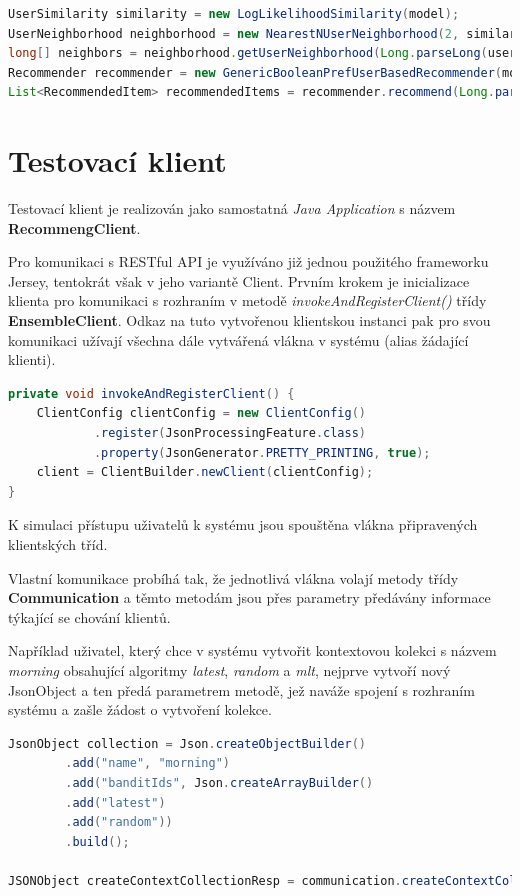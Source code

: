 \documentclass[thesis=M,czech]{FITthesis}[2014/05/07]
\begin{document}
\begin{lstlisting}[language=java]
UserSimilarity similarity = new LogLikelihoodSimilarity(model);
UserNeighborhood neighborhood = new NearestNUserNeighborhood(2, similarity, model);
long[] neighbors = neighborhood.getUserNeighborhood(Long.parseLong(userId));
Recommender recommender = new GenericBooleanPrefUserBasedRecommender(model, neighborhood, similarity);
List<RecommendedItem> recommendedItems = recommender.recommend(Long.parseLong(userId), limit);
\end{lstlisting}

\section{Testovací klient}
\label{chap:client}
Testovací klient je realizován jako samostatná \emph{Java Application} s názvem \textbf{RecommengClient}.

Pro komunikaci s RESTful API je využíváno již jednou použitého frameworku Jersey, tentokrát však v jeho variantě Client. Prvním krokem je inicializace klienta pro komunikaci s rozhraním v metodě \emph{invokeAndRegisterClient()} třídy \textbf{EnsembleClient}. Odkaz na tuto vytvořenou klientskou instanci pak pro svou komunikaci užívají všechna dále vytvářená vlákna v systému (alias žádající klienti).

\begin{lstlisting}[language=java]
private void invokeAndRegisterClient() {
    ClientConfig clientConfig = new ClientConfig()
            .register(JsonProcessingFeature.class)
            .property(JsonGenerator.PRETTY_PRINTING, true);
    client = ClientBuilder.newClient(clientConfig);        
}   
\end{lstlisting}

K simulaci přístupu uživatelů k systému jsou spouštěna vlákna připravených klientských tříd.

Vlastní komunikace probíhá tak, že jednotlivá vlákna volají metody třídy \textbf{Communication} a těmto metodám jsou přes parametry předávány informace týkající se chování klientů.

Například uživatel, který chce v systému vytvořit kontextovou kolekci s názvem \emph{morning} obsahující algoritmy \emph{latest}, \emph{random} a \emph{mlt}, nejprve vytvoří nový JsonObject a ten předá parametrem metodě, jež naváže spojení s rozhraním systému a zašle žádost o vytvoření kolekce.

\begin{lstlisting}[language=java]
JsonObject collection = Json.createObjectBuilder()
        .add("name", "morning")
        .add("banditIds", Json.createArrayBuilder()
        .add("latest")
        .add("random"))
        .build();

JSONObject createContextCollectionResp = communication.createContextCollectionRest(collection);
\end{lstlisting}
\end{document}
